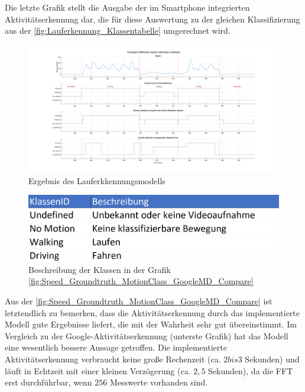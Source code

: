 Die letzte Grafik stellt die Ausgabe der im Smartphone integrierten Aktivitätserkennung dar, die für diese Auswertung zu der gleichen Klassifizierung aus der \autoref{fig:Lauferkennung_Klassentabelle} umgerechnet wird.

\begin{figure}[H]
	\centering
	\includegraphics[width=\linewidth]{Bilder/Speed_Groundtruth_MotionClass_GoogleMD_Compare.png}
	\caption{Ergebnis des Lauferkkennungsmodells}
	\label{fig:Speed_Groundtruth_MotionClass_GoogleMD_Compare}
\end{figure}

\begin{figure}[H]
	\centering
	\includegraphics[width=0.6\linewidth]{Bilder/Lauferkennung_Klassentabelle.png}
	\caption{Beschreibung der Klassen in der Grafik \autoref{fig:Speed_Groundtruth_MotionClass_GoogleMD_Compare}}
	\label{fig:Lauferkennung_Klassentabelle}
\end{figure}

Aus der \autoref{fig:Speed_Groundtruth_MotionClass_GoogleMD_Compare} ist letztendlich zu bemerken, dass die Aktivitätserkennung durch das implementierte Modell gute Ergebnisse liefert, die mit der Wahrheit sehr gut übereinstimmt. Im Vergleich zu der Google-Aktivitätserkennung (unterste Grafik) hat das Modell eine wesentlich bessere Aussage getroffen. Die implementierte Aktivitätserkennung verbraucht keine große Rechenzeit (ca. $2 bis 3$ Sekunden) und läuft in Echtzeit mit einer kleinen Verzögerung (ca. $2,5$ Sekunden), da die FFT erst durchführbar, wenn $256$ Messwerte vorhanden sind.



